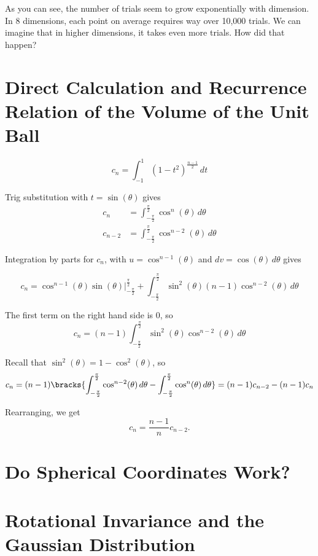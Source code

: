 \documentclass{article}
\begin{document}
As you can see, the number of trials seem to grow exponentially with dimension. In 8 dimensions, each point on average requires way over 10,000 trials. We can imagine that in higher dimensions, it takes even more trials. How did that happen?

\section{Direct Calculation and Recurrence Relation of the Volume of the Unit Ball}


\[
  c_n = \int_{-1}^1 (1 - t^2)^{\frac{n-1}{2}} \, dt
\]

Trig substitution with $t = \sin(\theta)$ gives
\begin{align*}
  c_n     & = \int_{-\frac{\pi}{2}}^{\frac{\pi}{2}} \cos^{n}(\theta) \, d\theta   \\
  c_{n-2} & = \int_{-\frac{\pi}{2}}^{\frac{\pi}{2}} \cos^{n-2}(\theta) \, d\theta
\end{align*}

Integration by parts for $c_n$, with $u = \cos^{n-1}(\theta)$ and $dv = \cos(\theta) \, d\theta$ gives

\[
  c_n = \cos^{n-1}(\theta) \sin(\theta) \bigg|_{-\frac{\pi}{2}}^{\frac{\pi}{2}} + \int_{-\frac{\pi}{2}}^{\frac{\pi}{2}} \sin^2(\theta) (n-1) \cos^{n-2}(\theta) \, d\theta
\]

The first term on the right hand side is 0, so
\[
  c_n = (n-1) \int_{-\frac{\pi}{2}}^{\frac{\pi}{2}} \sin^2(\theta) \cos^{n-2}(\theta) \, d\theta
\]

Recall that $\sin^2(\theta) = 1 - \cos^2(\theta)$, so
\[
  c_n = (n-1) \bracks{\int_{-\frac{\pi}{2}}^{\frac{\pi}{2}} \cos^{n-2}(\theta) \, d\theta - \int_{-\frac{\pi}{2}}^{\frac{\pi}{2}} \cos^n(\theta) \, d\theta} = (n-1) c_{n-2} - (n-1) c_n
\]

Rearranging, we get
\[
  c_n = \frac{n-1}{n}c_{n-2}.
\]

\section{Do Spherical Coordinates Work?}

\section{Rotational Invariance and the Gaussian Distribution}
\end{document}
